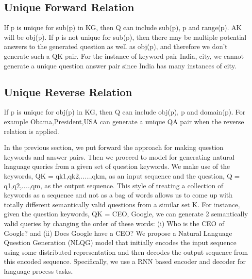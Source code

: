 \documentclass[conference]{IEEEtran}
\begin{document}
\subsection{Unique Forward Relation}
If p is unique for sub(p) in KG, then Q can include sub(p), p and range(p). AK will be obj(p). If p is not unique for sub(p), then there may be multiple potential answers to the generated question as well as obj(p), and therefore we don't generate such a QK pair. For the instance of keyword pair {India, city}, we cannot generate a unique question answer pair since India has many instances of city.
\newline

\subsection{Unique Reverse Relation}
If p is unique for obj(p) in KG, then Q can include obj(p), p and domain(p). For example {Obama,President,USA} can generate a unique QA pair when the reverse relation is applied.
\newline

In the previous section, we put forward the approach for making question keywords and answer pairs. Then we proceed to model for generating natural language queries from a given set of question keywords. We make use of the keywords, QK = {qk1,qk2,.....,qkm}, as an input sequence and the question, Q = {q1,q2,....,qm}, as the output sequence. This style of treating a collection of keywords as a sequence and not as a bag of words allows us to come up with totally different semantically valid questions from a similar set K. For instance, given the question keywords, QK = {CEO, Google}, we can generate 2 semantically valid queries by changing the order of these words: (i) Who is the CEO of Google? and (ii) Does Google have a CEO?
We propose a Natural Language Question Generation (NLQG) model that initially encodes the input sequence using some distributed representation and then decodes the output sequence from this encoded sequence. Specifically, we use a RNN based encoder and decoder for language process tasks. 
\end{document}
